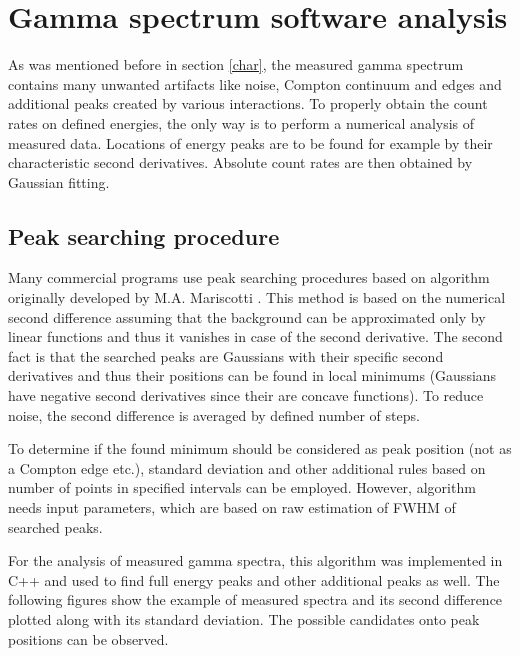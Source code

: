 \chapter{Gamma spectrum software analysis}
As was mentioned before in section \ref{char}, the measured gamma spectrum contains many unwanted artifacts like noise, Compton continuum and edges and additional peaks created by various interactions. To properly obtain the count rates on defined energies, the only way is to perform a numerical analysis of measured data. Locations of energy peaks are to be found for example by their characteristic second derivatives. Absolute count rates are then obtained by Gaussian fitting.


\section{Peak searching procedure}
\label{search}
Many commercial programs use peak searching procedures based on algorithm originally developed by M.A. Mariscotti \cite{MARISCOTTI1967309}. This method is based on the numerical second difference assuming that the background can be approximated only by linear functions and thus it vanishes in case of the second derivative. The second fact is that the searched peaks are Gaussians with their specific second derivatives and thus their positions can be found in local minimums (Gaussians have negative second derivatives since their are concave functions). To reduce noise, the second difference is averaged by defined number of steps.
\par
To determine if the found minimum should be considered as peak position (not as a Compton edge etc.), standard deviation and other additional rules based on number of points in specified intervals can be employed. However, algorithm needs input parameters, which are based on raw estimation of FWHM of searched peaks.
\par
For the analysis of measured gamma spectra, this algorithm was implemented in C++ and used to find full energy peaks and other additional peaks as well. The following figures show the example of measured spectra and its second difference plotted along with its standard deviation. The possible candidates onto peak positions can be observed.
\par


